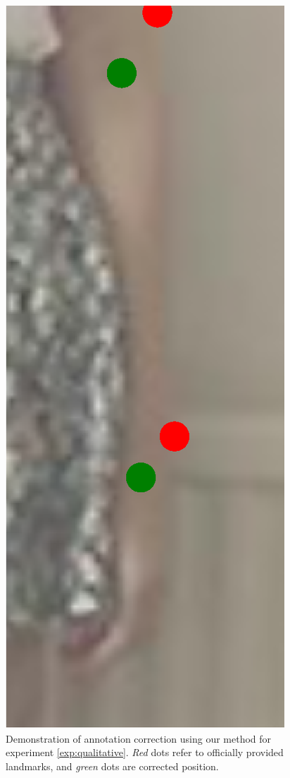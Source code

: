 \begin{figure}[!t]
    \includegraphics[height=\fh]{resources/Fixing/fix_18}
    \caption{Demonstration of annotation correction using our method for experiment \ref{exp:qualitative}. \emph{Red} dots refer to officially provided landmarks, and \emph{green} dots are corrected position.}
    \label{fig:qualitative}
\end{figure}

